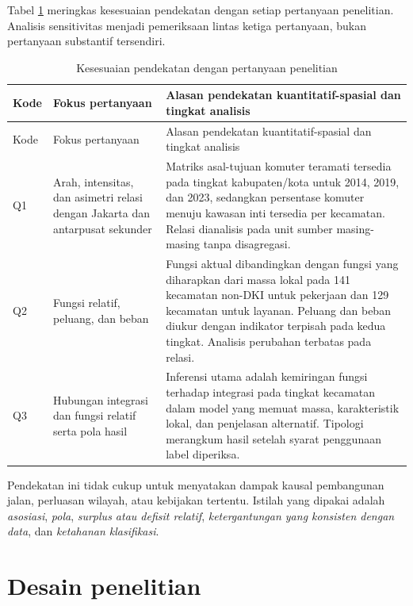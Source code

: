 \documentclass[12pt,a4paper,oneside,openany,indonesian]{report}
\begin{document}
Tabel \ref{tab:bab3-pendekatan} meringkas kesesuaian pendekatan dengan
setiap pertanyaan penelitian. Analisis sensitivitas menjadi pemeriksaan
lintas ketiga pertanyaan, bukan pertanyaan substantif tersendiri.

\begingroup
\footnotesize
\begin{longtable}{>{\raggedright\arraybackslash}p{} >{\raggedright\arraybackslash}p{} >{\raggedright\arraybackslash}p{}}
\caption{Kesesuaian pendekatan dengan pertanyaan penelitian}\label{tab:bab3-pendekatan}\\
\toprule
Kode & Fokus pertanyaan & Alasan pendekatan kuantitatif-spasial dan tingkat analisis \\
\midrule
\endfirsthead
\toprule
Kode & Fokus pertanyaan & Alasan pendekatan kuantitatif-spasial dan tingkat analisis \\
\midrule
\endhead
\bottomrule
\endlastfoot
Q1 & Arah, intensitas, dan asimetri relasi dengan Jakarta dan antarpusat sekunder & Matriks asal-tujuan komuter teramati tersedia pada tingkat kabupaten/kota untuk 2014, 2019, dan 2023, sedangkan persentase komuter menuju kawasan inti tersedia per kecamatan. Relasi dianalisis pada unit sumber masing-masing tanpa disagregasi. \\
Q2 & Fungsi relatif, peluang, dan beban & Fungsi aktual dibandingkan dengan fungsi yang diharapkan dari massa lokal pada 141 kecamatan non-DKI untuk pekerjaan dan 129 kecamatan untuk layanan. Peluang dan beban diukur dengan indikator terpisah pada kedua tingkat. Analisis perubahan terbatas pada relasi. \\
Q3 & Hubungan integrasi dan fungsi relatif serta pola hasil & Inferensi utama adalah kemiringan fungsi terhadap integrasi pada tingkat kecamatan dalam model yang memuat massa, karakteristik lokal, dan penjelasan alternatif. Tipologi merangkum hasil setelah syarat penggunaan label diperiksa. \\
\end{longtable}
\endgroup

Pendekatan ini tidak cukup untuk menyatakan dampak kausal pembangunan
jalan, perluasan wilayah, atau kebijakan tertentu. Istilah yang dipakai
adalah \emph{asosiasi}, \emph{pola}, \emph{surplus atau defisit
relatif}, \emph{ketergantungan yang konsisten dengan data}, dan
\emph{ketahanan klasifikasi}.

\section{Desain penelitian}\label{desain-penelitian}
\end{document}
